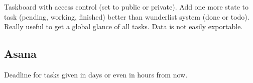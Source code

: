 \begin{itemize}
\adv Taskboard with access control (set to public or private).
\adv Add one more state to task (pending, working, finished) better than wunderlist system (done or todo).
\adv Really useful to get a global glance of all tasks.
\dsv Data is not easily exportable.
\end{itemize}

\subsection{Asana}
\begin{itemize}
\adv Deadline for tasks given in days or even in hours from now.
\end{itemize}
